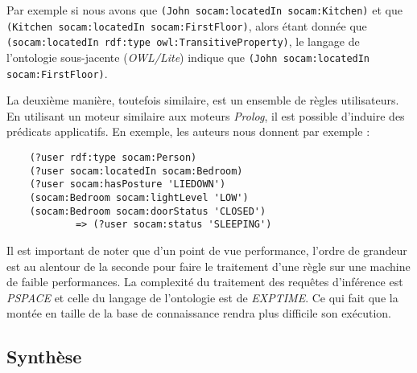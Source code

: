 Par exemple si nous avons que \verb|(John socam:locatedIn socam:Kitchen)| et que \verb|(Kitchen socam:locatedIn socam:FirstFloor)|, alors étant donnée que \verb|(socam:locatedIn rdf:type owl:TransitiveProperty)|, le langage de l'ontologie sous-jacente (\textit{OWL/Lite}) indique que \verb|(John socam:locatedIn socam:FirstFloor)|.

La deuxième manière, toutefois similaire, est un ensemble de règles utilisateurs. En utilisant un moteur similaire aux moteurs \textit{Prolog}, il est possible d'induire des prédicats applicatifs. En exemple, les auteurs nous donnent par exemple :
\begin{verbatim}
    (?user rdf:type socam:Person)
    (?user socam:locatedIn socam:Bedroom)
    (?user socam:hasPosture 'LIEDOWN')
    (socam:Bedroom socam:lightLevel 'LOW')
    (socam:Bedroom socam:doorStatus 'CLOSED')
            => (?user socam:status 'SLEEPING')
\end{verbatim}

Il est important de noter que d'un point de vue performance, l'ordre de grandeur est au alentour de la seconde pour faire le traitement d'une règle sur une machine de faible performances. La complexité du traitement des requêtes d'inférence est \textit{PSPACE} et celle du langage de l'ontologie est de \textit{EXPTIME}. Ce qui fait que la montée en taille de la base de connaissance rendra plus difficile son exécution.
\subsection{Synthèse}
